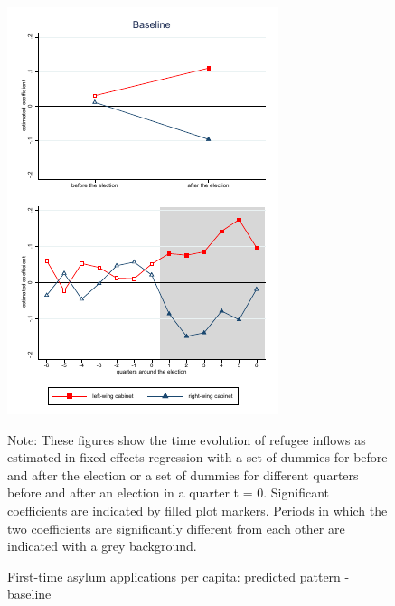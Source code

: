 \documentclass[11pt,a4paper]{scrartcl}
\begin{document}
\clearpage
\FloatBarrier
\begin{figure}[!ht]
	
	\caption{First-time asylum applications per capita: predicted pattern - baseline}
	\centering
	\begin{minipage}{0.8\textwidth} 
		\includegraphics[width=\linewidth]{../results/applications/app_graphs_baseline.pdf}
		{\scriptsize Note: These figures show the time evolution of refugee inflows as estimated in fixed effects regression with a set of dummies for before and after the election or a set of dummies for different quarters before and after an election in a quarter t = 0. Significant coefficients are indicated by filled plot markers. Periods in which the two coefficients are significantly different from each other are indicated with a grey background.\par}
	\end{minipage}
\end{figure}
\end{document}
